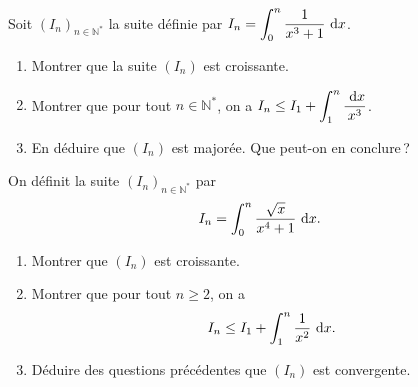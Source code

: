 %
\begin{exo}
      Soit $(I_n)_{n\in\mathbb{N}^*}$ la suite d\'efinie par 
            $\displaystyle{
                  I_n = \int_{0}^{n} \frac{1}{x^3 + 1} ~\mathrm{d}x}$.
      \begin{enumerate}
            \item Montrer que la suite $(I_n)$ est croissante.
            \item Montrer que pour tout $n\in\mathbb{N}^*$, on a 
                  $\displaystyle{
                        I_n \leq I_1 + \int_{1}^{n} \frac{~\mathrm{d}x}{x^3}
                  }$.
            \item En d\'eduire que $(I_n)$ est major\'ee. Que peut-on en conclure\,?
      \end{enumerate}
\end{exo}
%
\begin{exo}
      On d\'efinit la suite $(I_n)_{n\in\mathbb{N}^*}$ par 
            \[
                  I_n = \int_{0}^{n} \frac{\sqrt{x}}{x^4+1} ~\mathrm{d}x       .
            \]
      \begin{enumerate}
            \item Montrer que $(I_n)$ est croissante.
            \item Montrer que pour tout $n\geq 2$, on a 
                  \[
                        I_n \leq I_1 + \int_{1}^{n} \frac{1}{x^2} ~\mathrm{d}x      .
                  \]
            \item D\'eduire des questions pr\'ec\'edentes que $(I_n)$ est convergente.
      \end{enumerate}
\end{exo}
%

